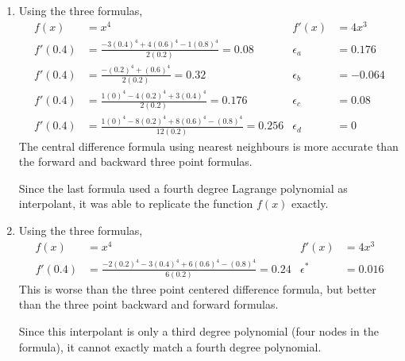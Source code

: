 \begin{enumerate}
    \item Using the three formulas,
          \begin{align}
              f(x)              & = x^4                                            &
              f'(x)             & = 4x^3                                             \\
              f'(0.4)           & = \frac{-3(0.4)^4 + 4(0.6)^4 - 1(0.8)^4}{2(0.2)}
              = 0.08            &
              \epsilon_a        & = 0.176                                            \\
              f'(0.4)           & = \frac{-(0.2)^4 + (0.6)^4}{2(0.2)} = 0.32       &
              \epsilon_b        & = -0.064                                           \\
              f'(0.4)           & = \frac{1(0)^4 - 4(0.2)^4 + 3(0.4)^4}{2(0.2)}
              = 0.176           &
              \epsilon_c        & = 0.08                                             \\
              f'(0.4)           & = \frac{1(0)^4 - 8(0.2)^4 + 8(0.6)^4 - (0.8)^4}
              {12(0.2)} = 0.256 &
              \epsilon_d        & = 0
          \end{align}
          The central difference formula using nearest neighbours is more accurate than
          the forward and backward three point formulas. \par
          Since the last formula used a fourth degree Lagrange polynomial as interpolant,
          it was able to replicate the function $ f(x) $ exactly.

    \item Using the three formulas,
          \begin{align}
              f(x)            & = x^4                                               &
              f'(x)           & = 4x^3                                                \\
              f'(0.4)         & = \frac{-2(0.2)^4 - 3(0.4)^4 + 6(0.6)^4  - (0.8)^4}
              {6(0.2)} = 0.24 &
              \epsilon^*      & = 0.016
          \end{align}
          This is worse than the three point centered difference formula, but better
          than the three point backward and forward formulas. \par
          Since this interpolant is only a third degree polynomial (four nodes in the
          formula), it cannot exactly match a fourth degree polynomial.


\end{enumerate}
